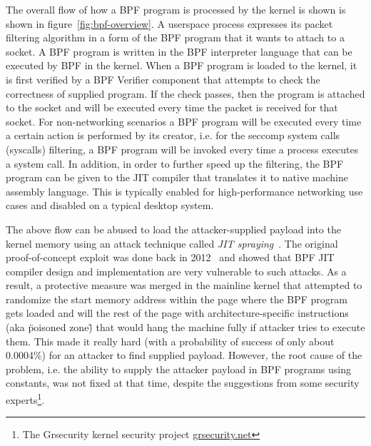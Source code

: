 The overall flow of how a BPF program is processed by the kernel is shown is shown in figure~\ref{fig:bpf-overview}.  
A userspace process expresses its packet filtering algorithm in a form of the BPF program that it wants to attach to a socket. A BPF program is written in the BPF interpreter language that can be executed by BPF in the kernel. When a BPF program is loaded to the kernel, it is first verified by a BPF Verifier component that attempts to check the correctness of supplied program. If the check passes, then the program is attached to the socket and will be executed every time the packet is received for that socket. For non-networking scenarios a BPF program will be executed every time a certain action is performed by its creator, i.e. for the seccomp system calls (syscalls) filtering, a BPF program will be invoked every time a process executes a system call. In addition, in order to further speed up the filtering, the BPF program can be given to the JIT compiler that translates it to native machine assembly language. This is typically enabled for high-performance networking use cases and disabled on a typical desktop system.  

The above flow can be abused to load the attacker-supplied payload into the kernel memory using an attack technique called \textit{JIT spraying}~\cite{blazakis2010, bania2010jit}. The original proof-of-concept exploit was done back in 2012~\cite{mcallister2012attacking} and showed that BPF JIT compiler design and implementation are very vulnerable to such attacks. As a result, a protective measure was merged in the mainline kernel that attempted to randomize the start memory address within the page where the BPF program gets loaded and will the rest of the page with architecture-specific instructions (aka \"poisoned zone\") that would hang the machine fully if attacker tries to execute them. This made it really hard (with a probability of success of only about 0.0004\%) for an attacker to find supplied payload. However, the root cause of the problem, i.e. the ability to supply the attacker payload in BPF programs using constants, was not fixed at that time, despite the suggestions from some security experts\footnote{The Grsecurity kernel security project \url{grsecurity.net}}.

